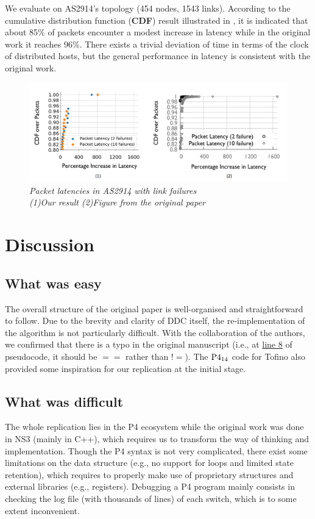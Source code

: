 We evaluate on AS2914's topology (454 nodes, 1543 links). 
According to the cumulative distribution function (\textbf{CDF}) result illustrated in , it is indicated that about 85\% of packets encounter a modest increase in latency while in the original work it reaches 96\%. 
There exists a trivial deviation of time in terms of the clock of distributed hosts, but the general performance in latency is consistent with the original work.


\begin{figure}[H]
      \centering \includegraphics[scale=0.52]{pictures/pktLatency.png}
      \caption{\it{Packet latencies in AS2914 with link failures\\(1)Our result (2)Figure from the original paper}}
      \label{fig:pktLatency}
\end{figure}

\section{Discussion}

\subsection{What was easy}
The overall structure of the original paper is well-organised and straightforward to follow. Due to the brevity and clarity of DDC itself, the re-implementation of the algorithm is not particularly difficult. 
With the collaboration of the authors, we confirmed that there is a typo in the original manuscript (i.e., at \hyperref[algo:DDC]{line 8} of pseudocode, it should be $==$ rather than $!=$).
The $\rm P4_{14}$ code for Tofino also provided some inspiration for our replication at the initial stage.

\subsection{What was difficult}
The whole replication lies in the P4 ecosystem while the original work was done in NS3 (mainly in C++), which requires us to transform the way of thinking and implementation. 
Though the P4 syntax is not very complicated, there exist some limitations on the data structure (e.g., no support for loops and limited state retention), which requires to properly make use of proprietary structures and external libraries (e.g., registers). 
Debugging a P4 program mainly consists in checking the log file (with thousands of lines) of each switch, which is to some extent inconvenient.

